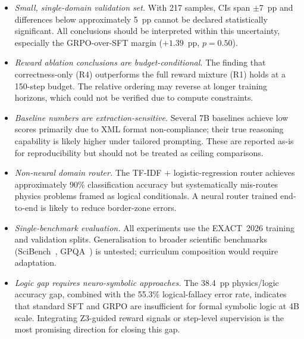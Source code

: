 \documentclass[cmc,journal,article,submit,moreauthors,pdftex]{Definitions/tsp}
\newcommand{\dataset}{EXACT~2026}
\begin{document}
\begin{itemize}
  \item \emph{Small, single-domain validation set.}
        With 217 samples, CIs span $\pm$7~pp and differences below
        approximately 5~pp cannot be declared statistically significant.
        All conclusions should be interpreted within this uncertainty,
        especially the GRPO-over-SFT margin ($+1.39$~pp, $p=0.50$).

  \item \emph{Reward ablation conclusions are budget-conditional.}
        The finding that correctness-only (R4) outperforms the full
        reward mixture (R1) holds at a 150-step budget.
        The relative ordering may reverse at longer training horizons,
        which could not be verified due to compute constraints.

  \item \emph{Baseline numbers are extraction-sensitive.}
        Several 7B baselines achieve low scores primarily due to XML
        format non-compliance; their true reasoning capability is likely
        higher under tailored prompting.
        These are reported as-is for reproducibility but should not be
        treated as ceiling comparisons.

  \item \emph{Non-neural domain router.}
        The TF-IDF + logistic-regression router achieves approximately
        90\% classification accuracy but systematically mis-routes physics
        problems framed as logical conditionals.
        A neural router trained end-to-end is likely to reduce
        border-zone errors.

  \item \emph{Single-benchmark evaluation.}
        All experiments use the \dataset{} training and validation splits.
        Generalisation to broader scientific benchmarks
        (SciBench~\cite{Wang2024scibench}, GPQA~\cite{Rein2023}) is
        untested; curriculum composition would require adaptation.

  \item \emph{Logic gap requires neuro-symbolic approaches.}
        The 38.4~pp physics/logic accuracy gap, combined with the
        55.3\% logical-fallacy error rate, indicates that standard SFT
        and GRPO are insufficient for formal symbolic logic at 4B scale.
        Integrating Z3-guided reward signals or step-level supervision is
        the most promising direction for closing this gap.
\end{itemize}
\end{document}
